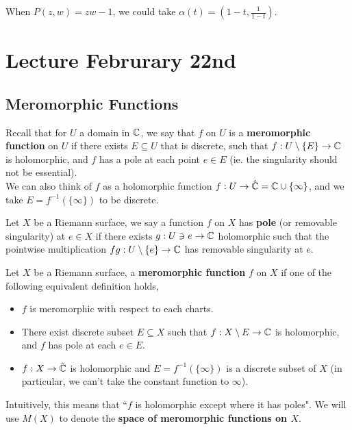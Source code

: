 \documentclass{article}
\begin{document}
{\begin{example}
    When $P(z, w) = zw - 1$, we could take $\alpha(t) = (1-t, \frac{1}{1-t})$.
\end{example}



\newpage
\section{Lecture Februrary 22nd}

\subsection{Meromorphic Functions}

Recall that for $U$ a domain in $\mathbb{C}$, we say that $f$ on $U$ is a \textbf{meromorphic function} on $U$ if there exists $E \subseteq U$ that is discrete, such that $f: U \setminus \{E\} \to \mathbb{C}$ is holomorphic, and $f$ has a pole at each point $e \in E$ (ie. the singularity should not be essential).\\

We can also think of $f$ as a holomorphic function $f: U \to \hat{\mathbb{C}} = \mathbb{C} \cup \{\infty\}$, and we take $E = f^{-1}(\{\infty\})$ to be discrete. 

\begin{definition}
    Let $X$ be a Riemann surface, we say a function $f$ on $X$ has \textbf{pole} (or removable singularity) at $e \in X$ if there exists $g: U \ni e \to \mathbb{C}$ holomorphic such that the pointwise multiplication $fg: U \setminus \{e\} \to \mathbb{C}$ has removable singularity at $e$.
\end{definition}

\begin{definition}
Let $X$ be a Riemann surface, a \textbf{meromorphic function} $f$ on $X$ if one of the following equivalent definition holds,
\begin{itemize}
    \item $f$ is meromorphic with respect to each charts.
    \item There exist discrete subset $E \subseteq X$ such that $f: X \setminus E \to \mathbb{C}$ is holomorphic, and $f$ has pole at each $e \in E$.
    \item $f: X \to \hat{\mathbb{C}}$ is holomorphic and $E = f^{-1}(\{\infty\})$ is a discrete subset of $X$ (in particular, we can't take the constant function to $\infty$). 
\end{itemize}
Intuitively, this means that ``$f$ is holomorphic except where it has poles". We will use $M(X)$ to denote the \textbf{space of meromorphic functions on $X$}.
\end{definition}

}
\end{document}
